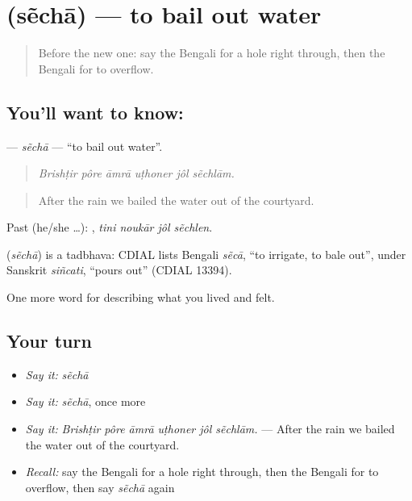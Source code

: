 \section[\texorpdfstring{\bn{সেঁচা} (sẽchā)}{সেঁচা (sẽchā)}]{ (sẽchā) — to bail out water}

\label{lesson:BN-C506-secha}



\begin{quote}
Before the new one: say the Bengali for a hole right through, then the Bengali for to overflow.
\end{quote}

\subsection*{You'll want to know: }
\textbf{} — \emph{sẽchā} — \textquotedblleft{}to bail out water\textquotedblright{}.

\begin{quote}
     
\end{quote}

\begin{quote}
\emph{Brishṭir pôre āmrā uṭhoner jôl sẽchlām.}
\end{quote}

\begin{quote}
After the rain we bailed the water out of the courtyard.
\end{quote}

Past (he/she …):    , \emph{tini noukār jôl sẽchlen}.

\begin{cousinweb}
\textbf{} (\emph{sẽchā}) is a tadbhava: CDIAL lists Bengali \emph{sẽcā}, \textquotedblleft{}to irrigate, to bale out\textquotedblright{}, under Sanskrit \emph{siñcati}, \textquotedblleft{}pours out\textquotedblright{} (CDIAL 13394).
\end{cousinweb}

\begin{grammarlens}[title={What you've built}]
One more word for describing what you lived and felt.
\end{grammarlens}

\subsection*{Your turn}
\begin{itemize}
\raggedright
  \item \emph{Say it:} \emph{sẽchā}
  \item \emph{Say it:} \emph{sẽchā}, once more
  \item \emph{Say it:} \emph{Brishṭir pôre āmrā uṭhoner jôl sẽchlām.} — After the rain we bailed the water out of the courtyard.
  \item \emph{Recall:} say the Bengali for a hole right through, then the Bengali for to overflow, then say \emph{sẽchā} again
\end{itemize}

